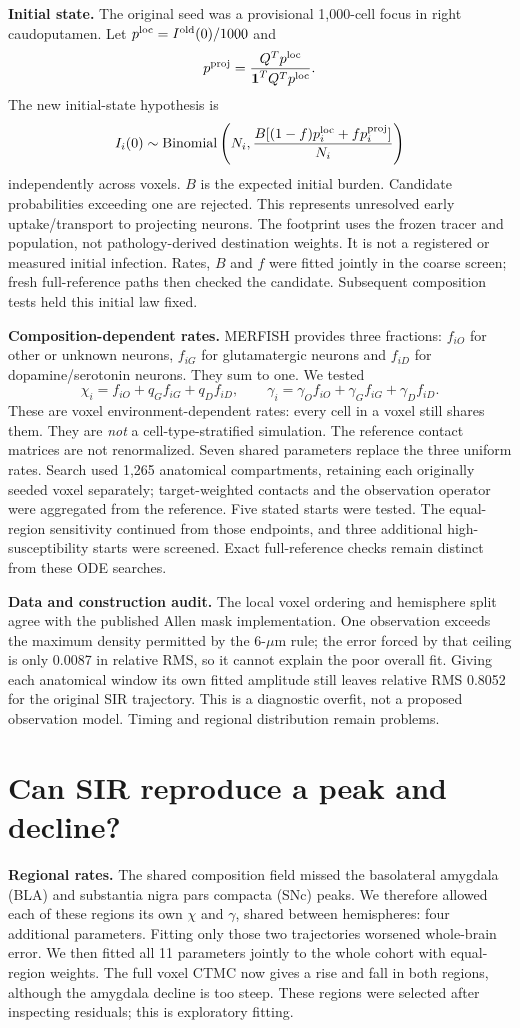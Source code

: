 \documentclass[10pt]{article}
\begin{document}
\textbf{Initial state.} The original seed was a provisional 1,000-cell focus in right caudoputamen. Let $p^{\rm loc}=I^{\rm old}(0)/1000$ and
\[
p^{\rm proj}=\frac{Q^Tp^{\rm loc}}{\boldsymbol 1^TQ^Tp^{\rm loc}}.
\]
The new initial-state hypothesis is
\[
I_i(0)\sim\operatorname{Binomial}\left(N_i,\frac{B[(1-f)p_i^{\rm loc}+fp_i^{\rm proj}]}{N_i}\right)
\]
independently across voxels. $B$ is the expected initial burden. Candidate probabilities exceeding one are rejected. This represents unresolved early uptake/transport to projecting neurons. The footprint uses the frozen tracer and population, not pathology-derived destination weights. It is not a registered or measured initial infection. Rates, $B$ and $f$ were fitted jointly in the coarse screen; fresh full-reference paths then checked the candidate. Subsequent composition tests held this initial law fixed.

\textbf{Composition-dependent rates.} MERFISH provides three fractions: $f_{iO}$ for other or unknown neurons, $f_{iG}$ for glutamatergic neurons and $f_{iD}$ for dopamine/serotonin neurons. They sum to one. We tested
\[
\chi_i=f_{iO}+q_Gf_{iG}+q_Df_{iD},\qquad
\gamma_i=\gamma_Of_{iO}+\gamma_Gf_{iG}+\gamma_Df_{iD}.
\]
These are voxel environment-dependent rates: every cell in a voxel still shares them. They are \emph{not} a cell-type-stratified simulation. The reference contact matrices are not renormalized. Seven shared parameters replace the three uniform rates. Search used 1,265 anatomical compartments, retaining each originally seeded voxel separately; target-weighted contacts and the observation operator were aggregated from the reference. Five stated starts were tested. The equal-region sensitivity continued from those endpoints, and three additional high-susceptibility starts were screened. Exact full-reference checks remain distinct from these ODE searches.

\textbf{Data and construction audit.} The local voxel ordering and hemisphere split agree with the published Allen mask implementation. One observation exceeds the maximum density permitted by the 6-$\mu$m rule; the error forced by that ceiling is only 0.0087 in relative RMS, so it cannot explain the poor overall fit. Giving each anatomical window its own fitted amplitude still leaves relative RMS 0.8052 for the original SIR trajectory. This is a diagnostic overfit, not a proposed observation model. Timing and regional distribution remain problems.

\newpage
\section*{Can SIR reproduce a peak and decline?}
\textbf{Regional rates.} The shared composition field missed the basolateral amygdala (BLA) and substantia nigra pars compacta (SNc) peaks. We therefore allowed each of these regions its own $\chi$ and $\gamma$, shared between hemispheres: four additional parameters. Fitting only those two trajectories worsened whole-brain error. We then fitted all 11 parameters jointly to the whole cohort with equal-region weights. The full voxel CTMC now gives a rise and fall in both regions, although the amygdala decline is too steep. These regions were selected after inspecting residuals; this is exploratory fitting.
\end{document}

